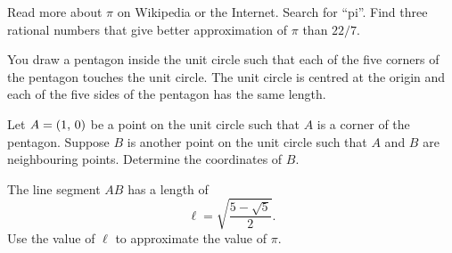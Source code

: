 \documentclass[a4paper,oneside,12pt]{article}
\begin{document}
\begin{problem}
\item Read more about $\pi$ on Wikipedia or the Internet.  Search for
  ``pi''.  Find three rational numbers that give better approximation
  of $\pi$ than $22 / 7$.

\item You draw a pentagon inside the unit circle such that each of the
  five corners of the pentagon touches the unit circle.  The unit
  circle is centred at the origin and each of the five sides of the
  pentagon has the same length.
  \begin{packedenum}
  \item\label{subprob:inscribed_pentagon_B_coordinates}
    Let $A = \left\lparen{1},\, {0}\right\rparen$ be a point on the unit circle such that $A$
    is a corner of the pentagon.  Suppose $B$ is another point on the
    unit circle such that $A$ and $B$ are neighbouring points.
    Determine the coordinates of $B$.

  \item\label{subprob:inscribed_pentagon_approximate_pi}
    The line segment $AB$ has a length of
    \[
    \ell
    =
    \sqrt{
      \frac{5 - \sqrt{5}}{2}
    }.
    \]
    Use the value of $\ell$ to approximate the value of $\pi$.
  \end{packedenum}


\end{problem}
\end{document}
